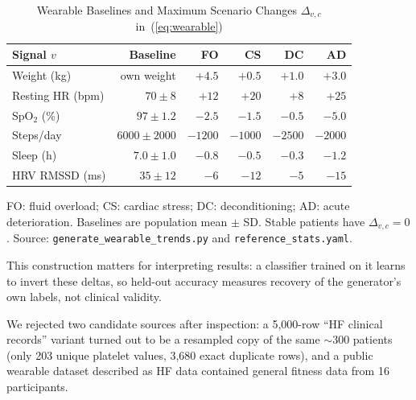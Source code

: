 \documentclass[conference]{IEEEtran}
\newcommand{\code}[1]{\texttt{\footnotesize #1}}
\begin{document}
\begin{table}[!t]
\centering
\setlength{\tabcolsep}{3pt}\caption{Wearable Baselines and Maximum Scenario Changes $\Delta_{v,c}$ in~(\ref{eq:wearable})}
\label{tab:deltas}
\footnotesize
\begin{tabular}{@{}lrrrrr@{}}
\toprule
\textbf{Signal $v$} & \textbf{Baseline} & \textbf{FO} & \textbf{CS} & \textbf{DC} & \textbf{AD} \\
\midrule
Weight (kg) & own weight & $+4.5$ & $+0.5$ & $+1.0$ & $+3.0$ \\
Resting HR (bpm) & $70\pm8$ & $+12$ & $+20$ & $+8$ & $+25$ \\
SpO$_2$ (\%) & $97\pm1.2$ & $-2.5$ & $-1.5$ & $-0.5$ & $-5.0$ \\
Steps/day & $6000\pm2000$ & $-1200$ & $-1000$ & $-2500$ & $-2000$ \\
Sleep (h) & $7.0\pm1.0$ & $-0.8$ & $-0.5$ & $-0.3$ & $-1.2$ \\
HRV RMSSD (ms) & $35\pm12$ & $-6$ & $-12$ & $-5$ & $-15$ \\
\bottomrule
\end{tabular}
\par\smallskip
\parbox{\columnwidth}{\scriptsize FO: fluid overload; CS: cardiac stress; DC: deconditioning; AD: acute deterioration. Baselines are population mean $\pm$ SD. Stable patients have $\Delta_{v,c}=0$. Source: \code{generate\_wearable\_trends.py} and \code{reference\_stats.yaml}.}
\end{table}

This construction matters for interpreting results: a classifier trained on it learns to invert these deltas, so held-out accuracy measures recovery of the generator's own labels, not clinical validity.

We rejected two candidate sources after inspection: a 5,000-row ``HF clinical records'' variant turned out to be a resampled copy of the same $\sim$300 patients (only 203 unique platelet values, 3,680 exact duplicate rows), and a public wearable dataset described as HF data contained general fitness data from 16 participants.
\end{document}
